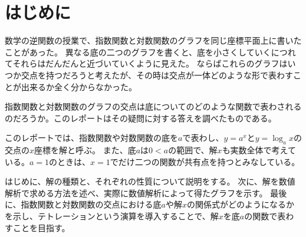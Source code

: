 \section{はじめに}

	数学の逆関数の授業で、指数関数と対数関数のグラフを同じ座標平面上に書いたことがあった。
	異なる底の二つのグラフを書くと、底を小さくしていくにつれてそれらはだんだんと近づいていくように見えた。
	ならばこれらのグラフはいつか交点を持つだろうと考えたが、その時は交点が一体どのような形で表わすことが出来るか全く分からなかった。
	
	指数関数と対数関数のグラフの交点は底についてのどのような関数で表わされるのだろうか。このレポートはその疑問に対する答えを調べたものである。

	このレポートでは、指数関数や対数関数の底を$a$で表わし、$y=a^x$と$y=\log_a x$の交点の$x$座標を解と呼ぶ。
	また、底$a$は$0 < a$の範囲で、解$x$も実数全体で考えている。$a=1$のときは、$x=1$でだけ二つの関数が共有点を持つとみなしている。
	
	はじめに、解の種類と、それぞれの性質について説明をする。
	次に、解を数値解析で求める方法を述べ、実際に数値解析によって得たグラフを示す。
	最後に、指数関数と対数関数の交点における底$a$や解$x$の関係式がどのようになるかを示し、テトレーションという演算を導入することで、解$x$を底$a$の関数で表わすことを目指す。
	